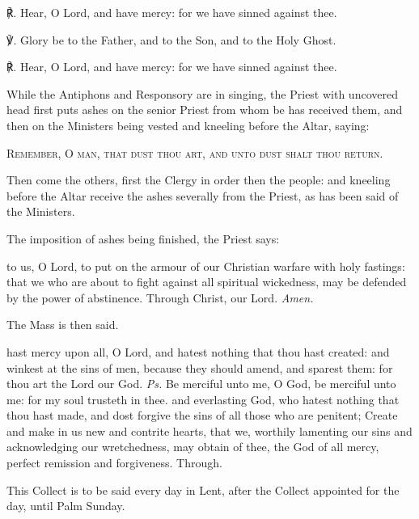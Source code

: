 ℟. Hear, O Lord, and have mercy: for we have sinned against thee.\par
℣. Glory be to the Father, and to the Son, and to the Holy Ghost.\par
℟. Hear, O Lord, and have mercy: for we have sinned against thee.\par
\begin{rubric}
    While the Antiphons and Responsory are in singing, the Priest with uncovered head first puts ashes on the senior Priest from whom be has received them, and then on the Ministers being vested and kneeling before the Altar, saying:
\end{rubric}
\begin{center}
    \textsc{Remember, O man, that dust thou art, and unto dust shalt thou return.}
\end{center}
\begin{rubric}
    Then come the others, first the Clergy in order then the people: and kneeling before the Altar receive the ashes severally from the Priest, as has been said of the Ministers.
\end{rubric}
\begin{rubric}
    The imposition of ashes being finished, the Priest says:
\end{rubric}
{} to us, O Lord, to put on the armour of our Christian warfare with holy fastings: that we who are about to fight against all spiritual wickedness, may be defended by the power of abstinence. Through Christ, our Lord. \textit{Amen.}
\begin{rubric}
    The Mass is then said.
\end{rubric}
\introit\label{AshWednesdayMass}
 hast mercy upon all, O Lord, and hatest nothing that thou hast created: and winkest at the sins of men, because they should amend, and sparest them: for thou art the Lord our God. \textit{Ps.} Be merciful unto me, O God, be merciful unto me: for my soul trusteth in thee.
\collect\label{AshWednesdayMassCollect}
 and everlasting God, who hatest nothing that thou hast made, and dost forgive the sins of all those who are penitent; Create and make in us new and contrite hearts, that we, worthily lamenting our sins and acknowledging our wretchedness, may obtain of thee, the God of all mercy, perfect remission and forgiveness. Through.
\begin{rubric}
This Collect is to be said every day in Lent, after the Collect appointed for the day, until Palm Sunday.
\end{rubric}
